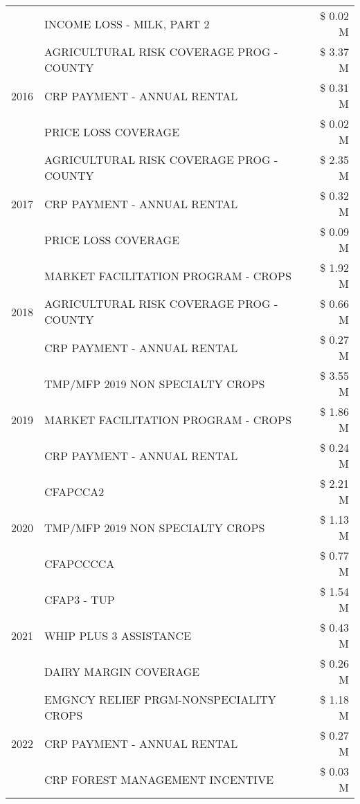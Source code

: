\begin{tabular}{llr}
 & INCOME LOSS - MILK, PART 2 & \$ 0.02 M \\
\cline{1-3}
\multirow[t]{3}{*}{2016} & AGRICULTURAL RISK COVERAGE PROG - COUNTY & \$ 3.37 M \\
 & CRP PAYMENT - ANNUAL RENTAL & \$ 0.31 M \\
 & PRICE LOSS COVERAGE & \$ 0.02 M \\
\cline{1-3}
\multirow[t]{3}{*}{2017} & AGRICULTURAL RISK COVERAGE PROG - COUNTY & \$ 2.35 M \\
 & CRP PAYMENT - ANNUAL RENTAL & \$ 0.32 M \\
 & PRICE LOSS COVERAGE & \$ 0.09 M \\
\cline{1-3}
\multirow[t]{3}{*}{2018} & MARKET FACILITATION PROGRAM - CROPS & \$ 1.92 M \\
 & AGRICULTURAL RISK COVERAGE PROG - COUNTY & \$ 0.66 M \\
 & CRP PAYMENT - ANNUAL RENTAL & \$ 0.27 M \\
\cline{1-3}
\multirow[t]{3}{*}{2019} & TMP/MFP 2019 NON SPECIALTY CROPS & \$ 3.55 M \\
 & MARKET FACILITATION PROGRAM - CROPS & \$ 1.86 M \\
 & CRP PAYMENT - ANNUAL RENTAL & \$ 0.24 M \\
\cline{1-3}
\multirow[t]{3}{*}{2020} & CFAPCCA2 & \$ 2.21 M \\
 & TMP/MFP 2019 NON SPECIALTY CROPS & \$ 1.13 M \\
 & CFAPCCCCA & \$ 0.77 M \\
\cline{1-3}
\multirow[t]{3}{*}{2021} & CFAP3 - TUP & \$ 1.54 M \\
 & WHIP PLUS 3 ASSISTANCE & \$ 0.43 M \\
 & DAIRY MARGIN COVERAGE & \$ 0.26 M \\
\cline{1-3}
\multirow[t]{3}{*}{2022} & EMGNCY RELIEF PRGM-NONSPECIALITY CROPS & \$ 1.18 M \\
 & CRP PAYMENT - ANNUAL RENTAL & \$ 0.27 M \\
 & CRP FOREST MANAGEMENT INCENTIVE & \$ 0.03 M \\
\cline{1-3}
\bottomrule
\end{tabular}
